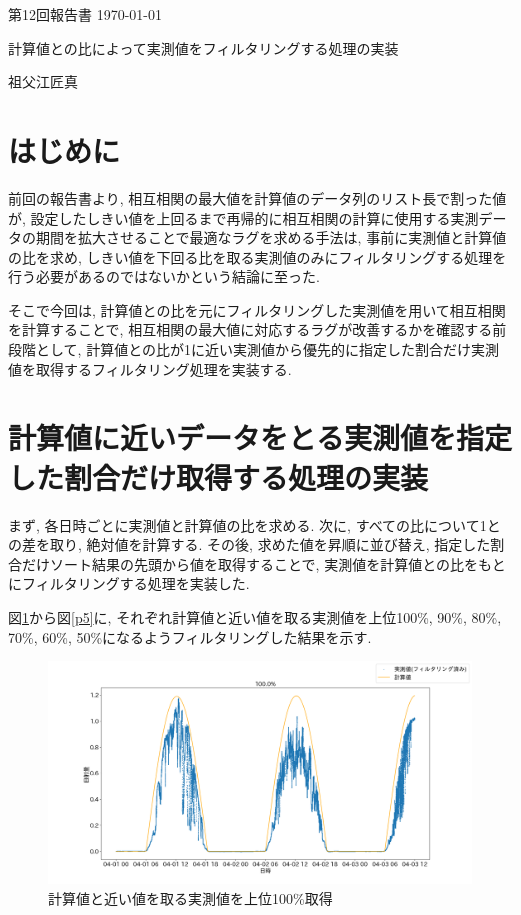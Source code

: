 \documentclass[a4j,12pt,]{jarticle}
\begin{document}
{\noindent\small 第12回報告書 \hfill\today}
\begin{center}
  {\Large 計算値との比によって実測値をフィルタリングする処理の実装}
\end{center}
\begin{flushright}
  祖父江匠真 \\
\end{flushright}

\section{はじめに}
前回の報告書より, 相互相関の最大値を計算値のデータ列のリスト長で割った値が, 設定したしきい値を上回るまで再帰的に相互相関の計算に使用する実測データの期間を拡大させることで最適なラグを求める手法は, 事前に実測値と計算値の比を求め, しきい値を下回る比を取る実測値のみにフィルタリングする処理を行う必要があるのではないかという結論に至った.

そこで今回は, 計算値との比を元にフィルタリングした実測値を用いて相互相関を計算することで, 相互相関の最大値に対応するラグが改善するかを確認する前段階として, 計算値との比が1に近い実測値から優先的に指定した割合だけ実測値を取得するフィルタリング処理を実装する.

\section{計算値に近いデータをとる実測値を指定した割合だけ取得する処理の実装}
まず, 各日時ごとに実測値と計算値の比を求める.
次に, すべての比について1との差を取り, 絶対値を計算する.
その後, 求めた値を昇順に並び替え, 指定した割合だけソート結果の先頭から値を取得することで, 実測値を計算値との比をもとにフィルタリングする処理を実装した.

図\ref{p1}から図\ref{p5}に, それぞれ計算値と近い値を取る実測値を上位100\%, 90\%, 80\%, 70\%, 60\%, 50\%になるようフィルタリングした結果を示す.

\begin{figure}[H]
  \begin{center}
    \includegraphics[width=160mm]{100.png}
    \caption{計算値と近い値を取る実測値を上位100\%取得}
    \label{p1}
  \end{center}
\end{figure}
\end{document}

